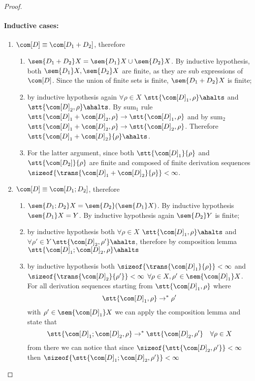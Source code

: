 \begin{proof}
  \paragraph*{Inductive cases:\\}
  \begin{enumerate}
  \item \(\com[D]\equiv \com[D_1 + D_2]\), therefore
    \begin{enumerate}[label=(\roman*).]
    \item \(\sem{D_1 + D_2} X = \sem{D_1}X \cup \sem{D_2}X\). By
      inductive hypothesis, both \(\sem{D_1}X, \sem{D_2}X\) are
      finite, as they are sub expressions of \(\com[D]\). Since the
      union of finite sets is finite, \(\sem{D_1 + D_2}X\) is finite;
    \item by inductive hypothesis again \(\forall \rho \in X\)
      \(\stt{\com[D]_1, \rho}\ahalts\) and
      \(\stt{\com[D]_2, \rho}\ahalts\). By sum\(_1\) rule
      \(\stt{\com[D]_1 + \com[D]_2, \rho} \to \stt{\com[D]_1, \rho}\)
      and by sum\(_2\)
      \(\stt{\com[D]_1 + \com[D]_2, \rho} \to \stt{\com[D]_2,
        \rho}\). Therefore
      \(\stt{\com[D]_1 + \com[D]_2}{\rho}\ahalts\).
    \item For the latter argument, since both
      \(\stt{\com[D]_1}{\rho}\) and \(\stt{\com[D_2]}{\rho}\) are
      finite and composed of finite derivation sequences
      \(\sizeof{\trans{\com[D]_1 + \com[D]_2}{\rho}} < \infty\).
    \end{enumerate}
  \item \(\com[D]\equiv \com[D_1; D_2]\), therefore
    \begin{enumerate}[label=(\roman*).]
    \item \(\sem{D_1;D_2}X = \sem{D_2}(\sem{D_1}X)\). By inductive
      hypothesis \(\sem{D_1}X = Y\). By inductive hypothesis again
      \(\sem{D_2}Y\) is finite;
    \item by inductive hypothesis both \(\forall \rho \in X\)
      \(\stt{\com[D]_1, \rho}\ahalts\) and \(\forall \rho' \in Y\)
      \(\stt{\com[D]_2,\rho'}\ahalts\), therefore by composition
      lemma \(\stt{\com[D]_1;\com[D]_2, \rho} \ahalts\)
    \item by inductive hypothesis both
      \(\sizeof{\trans{\com[D]_1}{\rho}} < \infty\) and
      \(\sizeof{\trans{\com[D]_2}{\rho'}} < \infty\)
      \(\forall \rho \in X, \rho'\in \sem{\com[D]_1}X\). For all
      derivation sequences starting from \(\stt{\com[D]_1, \rho}\)
      where \[\stt{\com[D]_1, \rho} \to^* \rho'\] with
      \(\rho'\in \sem{\com[D]_1}X\) we can apply the composition lemma
      and state that
      \[\stt{\com[D]_1;\com[D]_2, \rho} \to^* \stt{\com[D]_2, \rho'} \quad
        \forall \rho \in X\] from there we can notice that since
      \(\sizeof{\stt{\com[D]_2, \rho'}} < \infty\) then
      \(\sizeof{\stt{\com[D]_1;\com[D]_2, \rho'}} < \infty\)
    \end{enumerate}
  \end{enumerate}
\end{proof}


